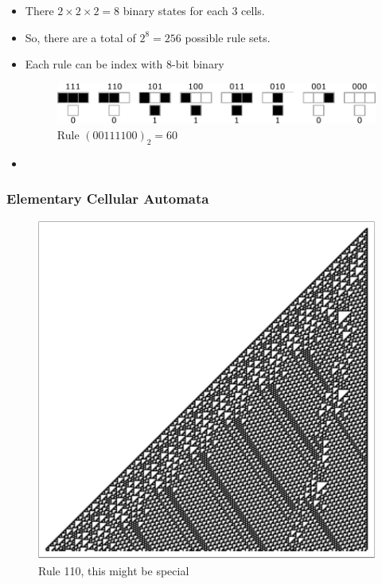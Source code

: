 \documentclass{beamer}
\begin{document}
\begin{frame}
    \begin{itemize}
        \item There $2\times2\times2=8$ binary states for each 3 cells.
        \item So, there are a total of $2^8 = 256$ possible rule sets.
        \item Each rule can be index with 8-bit binary
        \begin{figure}
            \centering
            \includegraphics[scale=0.7]{rule60Num.pdf}
            \caption{Rule $(00111100)_2 = 60$}
        \end{figure}
        \item 
    \end{itemize}
\end{frame}

\begin{frame}
    \frametitle{Elementary Cellular Automata}
    \begin{figure}
        \centering
        \includegraphics[scale=0.43]{fig4.pdf}
        \caption{Rule 110, this might be special}
    \end{figure}
\end{frame}
\end{document}
